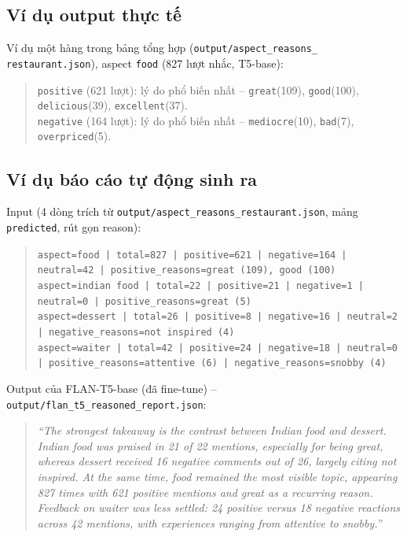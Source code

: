 \documentclass[11pt,a4paper]{article}
\begin{document}
\subsection{Ví dụ output thực tế}

Ví dụ một hàng trong bảng tổng hợp (\texttt{output/\allowbreak aspect\_\allowbreak reasons\_\allowbreak %
restaurant.json}), aspect \texttt{food} (827 lượt nhắc, T5-base):

\begin{quote}
\texttt{positive} (621 lượt): lý do phổ biến nhất --
\texttt{great}(109), \texttt{good}(100), \texttt{delicious}(39),
\texttt{excellent}(37). \\
\texttt{negative} (164 lượt): lý do phổ biến nhất --
\texttt{mediocre}(10), \texttt{bad}(7), \texttt{overpriced}(5).
\end{quote}

\subsection{Ví dụ báo cáo tự động sinh ra}

Input (4 dòng trích từ \texttt{output/\allowbreak aspect\_\allowbreak reasons\_\allowbreak restaurant.json},
mảng \texttt{predicted}, rút gọn reason):

\begin{quote}
\small
\texttt{aspect=food | total=827 | positive=621 | negative=164 | neutral=42 |
positive\_reasons=great (109), good (100)} \\
\texttt{aspect=indian food | total=22 | positive=21 | negative=1 |
neutral=0 | positive\_reasons=great (5)} \\
\texttt{aspect=dessert | total=26 | positive=8 | negative=16 | neutral=2 |
negative\_reasons=not inspired (4)} \\
\texttt{aspect=waiter | total=42 | positive=24 | negative=18 | neutral=0 |
positive\_reasons=attentive (6) | negative\_reasons=snobby (4)}
\end{quote}

Output của FLAN-T5-base (đã fine-tune) --
\texttt{output/\allowbreak flan\_\allowbreak t5\_\allowbreak reasoned\_\allowbreak report.json}:

\begin{quote}
\emph{``The strongest takeaway is the contrast between Indian food and
dessert. Indian food was praised in 21 of 22 mentions, especially for
being great, whereas dessert received 16 negative comments out of 26,
largely citing not inspired. At the same time, food remained the most
visible topic, appearing 827 times with 621 positive mentions and great
as a recurring reason. Feedback on waiter was less settled: 24 positive
versus 18 negative reactions across 42 mentions, with experiences
ranging from attentive to snobby.''}
\end{quote}
\end{document}
